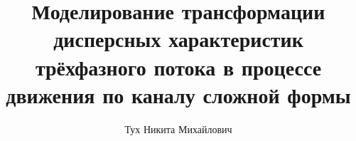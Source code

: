 \title{Моделирование трансформации дисперсных характеристик трёхфазного потока в процессе движения по каналу сложной формы}
\author{Тух Никита Михайлович}

\makeatletter
\renewcommand{\maketitle}{
	\begin{titlepage}
		\renewcommand{\baselinestretch}{1}
		\begin{small}
			\begin{center}
				Федеральное государственное автономное образовательное учреждение\\
				высшего образования «Московский физико-технический институт\\
				(национальный исследовательский университет)»\\[.5\baselineskip]
				Физтех-школа аэрокосмических технологий\\[.5\baselineskip]
				Кафедра компьютерного моделирования
			\end{center}
			
			~\
			
			\textbf{Направление подготовки:} 03.03.01 Прикладные математика и физика (бакалавриат)
			
			\textbf{Направленность (профиль) подготовки:} Аэродинамика и теплообмен летательных аппаратов
			
			\textbf{Форма обучения:} очная
		\end{small}
		
		\vfill
		
		\begin{center}
			ВЫПУСКНАЯ КВАЛИФИКАЦИОННАЯ РАБОТА\\[.5\baselineskip]
			\textbf{«\@title»}\\[.5\baselineskip]
			(бакалаврская работа)
		\end{center}
		
		\vfill
		
		\begin{flushright}
			\begin{minipage}{.5\linewidth}
				\textbf{Студент:}\\
				\@author\\
				\(\underset{\emph{(подпись студента)}}{\uline{\hspace*{\linewidth-\baselineskip}}}\)
				
				~\
				

\end{minipage}
\end{flushright}
\end{titlepage}}
